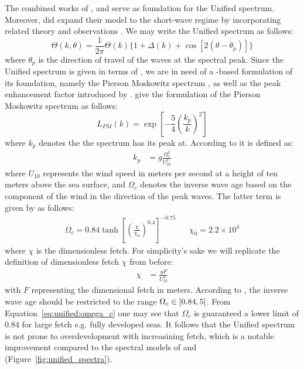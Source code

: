 The combined works of \citet{article:Hasselman1973}, \citet{article:Mitsuyasu1975}
and \citet{article:Donelan1985} serve as foundation for the Unified spectrum. 
Moreover, \citeauthor{article:Elfouhaily1997} did expand their model to the
short-wave regime by incorporating related theory \citep{book:Kitaigorodskii1970,
article:Phillips1985} and observations \citep{article:CoxMunk1954,article:Jaehne1990a,
article:Hara1994}. We may write the Unified spectrum as follows:
%
\begin{equation}
\label{eq:unified:theta}
 \Theta(k, \theta) = \frac{1}{2\pi}\Theta(k)\{1 + \Delta(k) + \cos[2(\theta - \theta_p)]\}
\end{equation}
%
where $\theta_p$ is the direction of travel of the waves at the spectral peak. 
Since the Unified spectrum is given in terms of \wavenumber, we are in need of a 
\wavenumber-based formulation of its foundation, namely the Pierson Moskowitz 
spectrum \citep{article:PiersonMoskowitz1964}, as well as the peak enhancement
factor introduced by \citet{article:Hasselman1973}.
\citeauthor{article:Elfouhaily1997} give the \wavenumber formulation of the
Pierson Moskowitz spectrum as follows:
%
\begin{equation*}
 L_{PM}(k) = \exp\left[-\frac{5}{4} \left(\frac{k_p}{k}\right)^2 \right]
\end{equation*}
where $k_p$ denotes the \wavenumber the spectrum has its peak at.
According to \citeauthor{article:Elfouhaily1997} it is defined as:
\begin{align*}
k_p &= g\frac{\Omega_c^2}{U_{10}^2}
\end{align*}
where $U_{10}$ represents the wind speed in meters per second at a height of ten
meters above the sea surface, and $\Omega_c$ denotes the inverse wave age based
on the component of the wind in the direction of the peak waves.
The latter term is given by \citeauthor{article:Elfouhaily1997} as follows:
\begin{align}
\label{eq:unified:omega_c} \Omega_c = 0.84 \tanh\left[\left(\frac{\chi}{\chi_0}\right)^{0.4}\right]^{-0.75} && \chi_0 = 2.2 \times 10^4
\end{align}
where $\chi$ is the dimensionless fetch. For simplicity's sake we will replicate
the definition of dimensionless fetch $\chi$ from before:
\begin{align*}
 \chi &= \frac{gF}{U_{10}^{2}}
\end{align*}
with $F$ representing the dimensional fetch in meters.
According to \citeauthor{article:Elfouhaily1997}, the inverse wave age
should be restricted to the range $\Omega_c \in \interval[open right]{0.84}{5}$.
From Equation~\ref{eq:unified:omega_c} one may see that $\Omega_c$ is guaranteed
a lower limit of $0.84$ for large fetch e.g. fully developed seas.
It follows that the Unified spectrum is not prone to overdevelopment with
increasining fetch, which is a notable improvement 
compared to the spectral models of \citet{article:Hasselman1973}
and \citet{article:Donelan1985} (Figure~\ref{fig:unified_spectra}).

